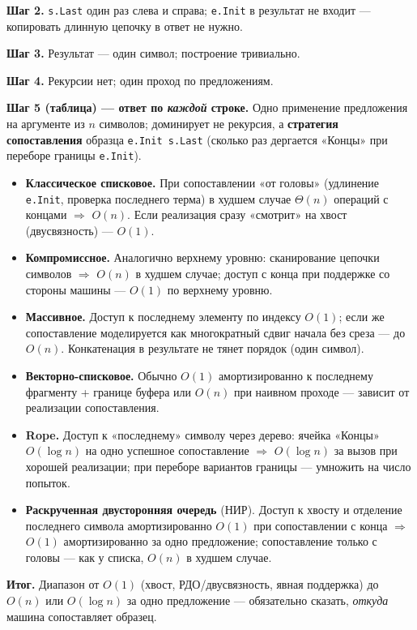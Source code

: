 \documentclass[12pt,a4paper]{article}
\newcommand{\bigO}{\ensuremath{O}}
\begin{document}
\textbf{Шаг 2.} \texttt{s.Last} один раз слева и справа; \texttt{e.Init} в результат не входит --- копировать длинную цепочку в ответ не нужно.

\textbf{Шаг 3.} Результат --- один символ; построение тривиально.

\textbf{Шаг 4.} Рекурсии нет; один проход по предложениям.

\textbf{Шаг 5 (таблица) --- ответ по \emph{каждой} строке.} Одно применение предложения на аргументе из \(n\) символов; доминирует не рекурсия, а \textbf{стратегия сопоставления} образца \texttt{e.Init s.Last} (сколько раз дергается «Концы» при переборе границы \texttt{e.Init}).

\begin{itemize}
  \item \textbf{Классическое списковое.} При сопоставлении «от головы» (удлинение \texttt{e.Init}, проверка последнего терма) в худшем случае \(\Theta(n)\) операций с концами \(\Rightarrow\) \(\bigO(n)\). Если реализация сразу «смотрит» на хвост (двусвязность) --- \(\bigO(1)\).
  \item \textbf{Компромиссное.} Аналогично верхнему уровню: сканирование цепочки символов \(\Rightarrow\) \(\bigO(n)\) в худшем случае; доступ с конца при поддержке со стороны машины --- \(\bigO(1)\) по верхнему уровню.
  \item \textbf{Массивное.} Доступ к последнему элементу по индексу \(\bigO(1)\); если же сопоставление моделируется как многократный сдвиг начала без среза --- до \(\bigO(n)\). Конкатенация в результате не тянет порядок (один символ).
  \item \textbf{Векторно-списковое.} Обычно \(\bigO(1)\) амортизированно к последнему фрагменту + границе буфера или \(\bigO(n)\) при наивном проходе --- зависит от реализации сопоставления.
  \item \textbf{Rope.} Доступ к «последнему» символу через дерево: ячейка «Концы» \(O(\log n)\) на одно успешное сопоставление \(\Rightarrow\) \(\bigO(\log n)\) за вызов при хорошей реализации; при переборе вариантов границы --- умножить на число попыток.
  \item \textbf{Раскрученная двусторонняя очередь} (НИР). Доступ к хвосту и отделение последнего символа амортизированно \(\bigO(1)\) при сопоставлении с конца \(\Rightarrow\) \(\bigO(1)\) амортизированно за одно предложение; сопоставление только с головы --- как у списка, \(\bigO(n)\) в худшем случае.
\end{itemize}

\textbf{Итог.} Диапазон от \(\bigO(1)\) (хвост, РДО/двусвязность, явная поддержка) до \(\bigO(n)\) или \(\bigO(\log n)\) за одно предложение --- обязательно сказать, \emph{откуда} машина сопоставляет образец.
\end{document}

